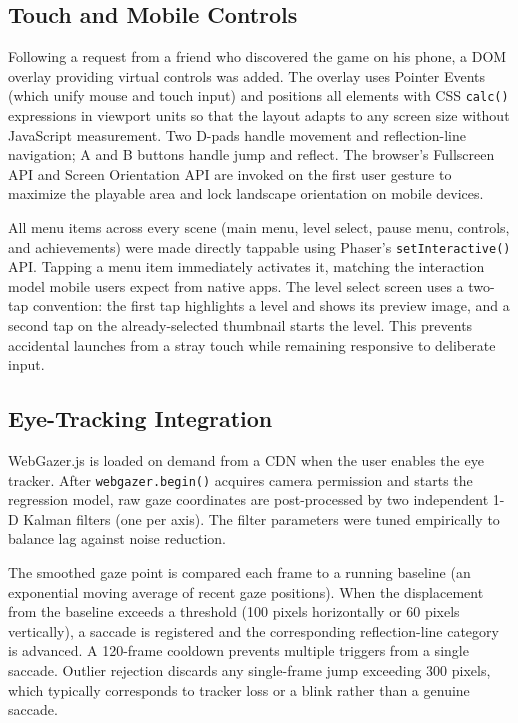 \documentclass[11pt,twocolumn]{article}
\begin{document}
\subsection{Touch and Mobile Controls}

Following a request from a friend who discovered the game on his phone, a DOM
overlay providing virtual controls was added. The overlay uses Pointer Events
(which unify mouse and touch input) and positions all elements with CSS
\texttt{calc()} expressions in viewport units so that the layout adapts to any
screen size without JavaScript measurement. Two D-pads handle movement and
reflection-line navigation; A and B buttons handle jump and reflect. The
browser's Fullscreen API and Screen Orientation API are invoked on the first
user gesture to maximize the playable area and lock landscape orientation on
mobile devices.

All menu items across every scene (main menu, level select, pause menu,
controls, and achievements) were made directly tappable using Phaser's
\texttt{setInteractive()} API. Tapping a menu item immediately activates it,
matching the interaction model mobile users expect from native apps. The level
select screen uses a two-tap convention: the first tap highlights a level and
shows its preview image, and a second tap on the already-selected thumbnail
starts the level. This prevents accidental launches from a stray touch while
remaining responsive to deliberate input.

\subsection{Eye-Tracking Integration}

WebGazer.js is loaded on demand from a CDN when the user enables the eye
tracker. After \texttt{webgazer.begin()} acquires camera permission and starts
the regression model, raw gaze coordinates are post-processed by two
independent 1-D Kalman filters (one per axis). The filter parameters were
tuned empirically to balance lag against noise reduction.

The smoothed gaze point is compared each frame to a running baseline (an
exponential moving average of recent gaze positions). When the displacement
from the baseline exceeds a threshold (100 pixels horizontally or 60 pixels
vertically), a saccade is registered and the corresponding reflection-line
category is advanced. A 120-frame cooldown prevents multiple triggers from a
single saccade. Outlier rejection discards any single-frame jump exceeding 300
pixels, which typically corresponds to tracker loss or a blink rather than a
genuine saccade.
\end{document}
